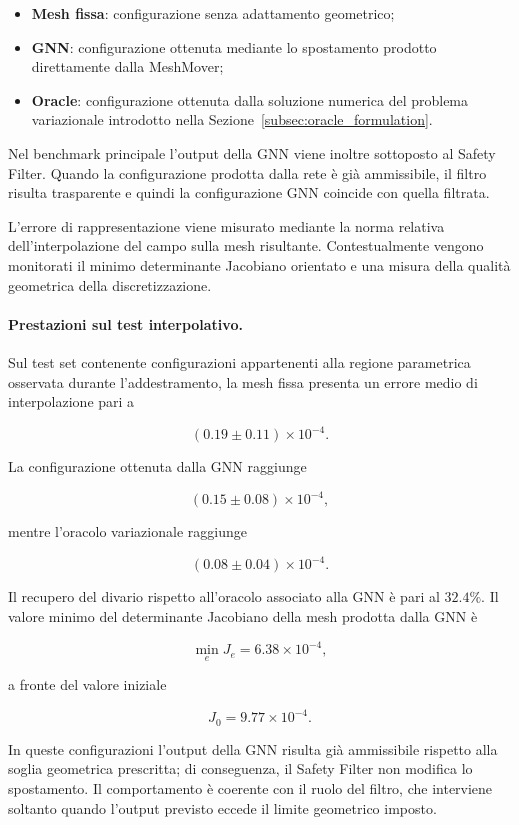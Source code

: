 \begin{itemize}
    \item \textbf{Mesh fissa}: configurazione senza adattamento geometrico;
    \item \textbf{GNN}: configurazione ottenuta mediante lo spostamento prodotto direttamente dalla MeshMover;
    \item \textbf{Oracle}: configurazione ottenuta dalla soluzione numerica del problema variazionale introdotto nella Sezione~\ref{subsec:oracle_formulation}.
\end{itemize}

Nel benchmark principale l'output della GNN viene inoltre sottoposto al Safety Filter. Quando la configurazione prodotta dalla rete è già ammissibile, il filtro risulta trasparente e quindi la configurazione GNN coincide con quella filtrata.

L'errore di rappresentazione viene misurato mediante la norma relativa dell'interpolazione del campo sulla mesh risultante. Contestualmente vengono monitorati il minimo determinante Jacobiano orientato e una misura della qualità geometrica della discretizzazione.

\paragraph{Prestazioni sul test interpolativo.}

Sul test set contenente configurazioni appartenenti alla regione parametrica osservata durante l'addestramento, la mesh fissa presenta un errore medio di interpolazione pari a

\[
(0.19\pm0.11)\times10^{-4}.
\]

La configurazione ottenuta dalla GNN raggiunge

\[
(0.15\pm0.08)\times10^{-4},
\]

mentre l'oracolo variazionale raggiunge

\[
(0.08\pm0.04)\times10^{-4}.
\]

Il recupero del divario rispetto all'oracolo associato alla GNN è pari al $32.4\%$. Il valore minimo del determinante Jacobiano della mesh prodotta dalla GNN è

\[
\min_e J_e = 6.38\times10^{-4},
\]

a fronte del valore iniziale

\[
J_0 = 9.77\times10^{-4}.
\]

In queste configurazioni l'output della GNN risulta già ammissibile rispetto alla soglia geometrica prescritta; di conseguenza, il Safety Filter non modifica lo spostamento. Il comportamento è coerente con il ruolo del filtro, che interviene soltanto quando l'output previsto eccede il limite geometrico imposto.

